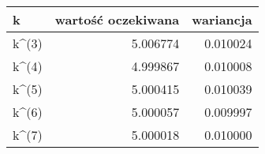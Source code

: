 \begin{tabular}{lrr}
\toprule
    k &  wartość oczekiwana &  wariancja \\
\midrule
k\textasciicircum (3) &            5.006774 &   0.010024 \\
k\textasciicircum (4) &            4.999867 &   0.010008 \\
k\textasciicircum (5) &            5.000415 &   0.010039 \\
k\textasciicircum (6) &            5.000057 &   0.009997 \\
k\textasciicircum (7) &            5.000018 &   0.010000 \\
\bottomrule
\end{tabular}
